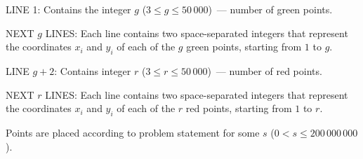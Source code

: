 LINE 1: Contains the integer $g$ ($3 \le g \le 50\,000$)~--- number of green points.

NEXT $g$ LINES: Each line contains two space-separated integers that
represent the coordinates $x_i$ and $y_i$ of each of the $g$ green
points, starting from $1$ to $g$.

LINE $g + 2$: Contains integer $r$ ($3 \le r \le 50\,000$)~--- number of red points.

NEXT $r$ LINES: Each line contains two space-separated integers that
represent the coordinates $x_i$ and $y_i$ of each of the $r$ red points,
starting from $1$ to $r$.

Points are placed according to problem statement for some $s$ ($0 < s \le 200\,000\,000$).